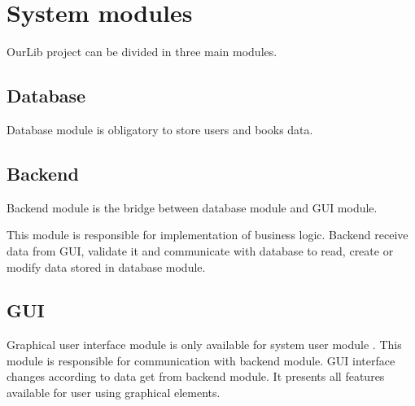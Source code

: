 \section{System modules}

OurLib project can be divided in three main modules.

\subsection{Database}
Database module is obligatory to store users and books data.

\subsection{Backend}
Backend module is the bridge between database module and GUI module. 

This module is responsible for implementation of business logic. Backend receive data from GUI, validate it and communicate with database to read, create or modify data stored in database module.

\subsection{GUI}
Graphical user interface module is only available for system user module . This module is responsible for communication with backend module. GUI interface changes according to data get from backend module. It presents all features available for user using graphical elements.